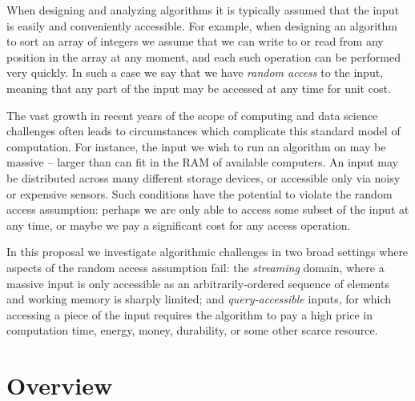\label{chap:intro}


When designing and analyzing algorithms it is typically assumed that the input is easily and conveniently accessible.  For example, when designing an algorithm to sort an array of integers we assume that we can write to or read from any position in the array at any moment, and each such operation can be performed very quickly.  In such a case we say that we have \emph{random access} to the input, meaning that any part of the input may be accessed at any time for unit cost.

The vast growth in recent years of the scope of computing and data science challenges often leads to circumstances which complicate this standard model of computation.  For instance, the input we wish to run an algorithm on may be massive -- larger than can fit in the RAM of available computers.  An input may be distributed across many different storage devices, or accessible only via noisy or expensive sensors.  Such conditions have the potential to violate the random access assumption:  perhaps we are only able to access some subset of the input at any time, or maybe we pay a significant cost for any access operation.

In this proposal we investigate algorithmic challenges in two broad settings where aspects of the random access assumption fail: the \emph{streaming} domain, where a massive input is only accessible as an arbitrarily-ordered sequence of elements and working memory is sharply limited; and \emph{query-accessible} inputs, for which accessing a piece of the input requires the algorithm to pay a high price in computation time, energy, money, durability, or some other scarce resource.

\section{Overview}

